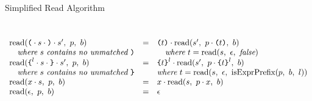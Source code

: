 \documentclass[preprint,10pt]{sigplanconf}
\begin{document}
\begin{displayfigure*}{\label{fig:simpleread}Simplified Read Algorithm}
\[\begin{array}{lcll}
    \\ \\
    

    \textrm{read}(\texttt{(} \cdot s \cdot \texttt{)} \cdot s',~p,~b)
    &=&
    \texttt{(}t\texttt{)} \cdot 
      \textrm{read}(s',~p \cdot \texttt{(}t\texttt{)},~b)
    
    \\
    \quad \textit{where}~s~\textit{contains no unmatched}~\texttt{)} 
    &&\quad \textit{where}~t = \textrm{read}(s,~\epsilon,~\textit{false}) 
    \\
    \textrm{read}(
      \texttt{\{}^l \cdot s \cdot \texttt{\}} \cdot s'
    ,~p,~b)
    &=&
    \texttt{\{}t\texttt{\}}^l \cdot 
      \textrm{read}(s',~
        p \cdot \texttt{\{}t\texttt{\}}^l
      ,~b)
    
    \\
    \quad \textit{where}~s~\textit{contains no unmatched}~\texttt{\}} 
    && \textit{where}~t = \textrm{read}(s,~\epsilon,~\textrm{isExprPrefix}(p,~b,~l))
    \\
    \textrm{read}(x \cdot s,~p,~b)
    &=&
    x \cdot 
      \textrm{read}(s,~p \cdot x,~b)
   
    \\
    \textrm{read}(\epsilon,~p,~b)
    &=&
    \epsilon \\
  \end{array}
\]
\end{displayfigure*}
\end{document}
